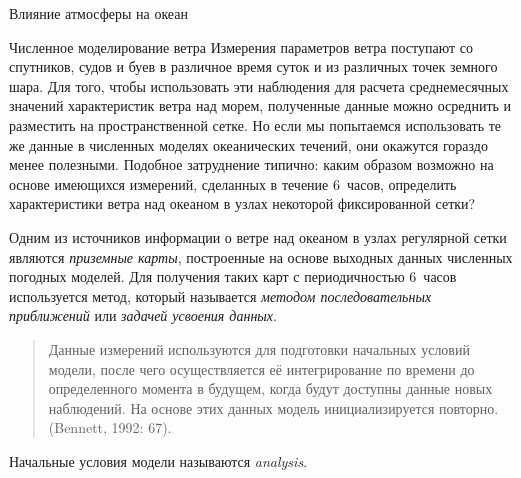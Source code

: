 \begin{chapter}{Влияние атмосферы на океан}
\begin{section}{Численное моделирование ветра}\label{sec:wndcalc}
Измерения параметров ветра поступают со спутников, судов и буев в различное 
время суток и из различных точек земного шара. Для того, чтобы использовать 
эти наблюдения для расчета среднемесячных значений характеристик ветра над 
морем, полученные данные можно осреднить и разместить на пространственной сетке. 
Но если мы попытаемся использовать те же данные в численных моделях 
океанических течений, они окажутся гораздо менее полезными. Подобное 
затруднение типично: каким образом возможно на основе имеющихся измерений,
сделанных в течение 6~часов, определить характеристики ветра над океаном
в узлах некоторой фиксированной сетки?
%

Одним из источников информации о ветре над океаном в узлах регулярной сетки
являются \emph{приземные карты}, построенные на основе выходных данных 
численных погодных моделей. Для получения таких карт с периодичностью 6~часов
используется метод, который называется 
\emph{методом последовательных приближений} 
или \emph{задачей усвоения данных}.
\begin{quotation} 
Данные измерений используются для подготовки начальных условий модели, 
после чего осуществляется её интегрирование по времени до определенного 
момента в будущем, когда будут доступны данные новых наблюдений. 
На основе этих данных модель инициализируется повторно. (Bennett, 1992: 67).
\end{quotation}
Начальные условия модели называются \textit{analysis}.
%


\end{section}
\end{chapter}
